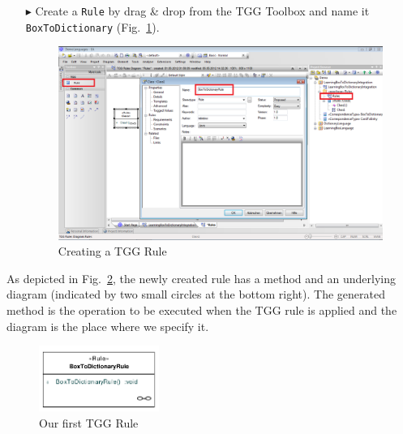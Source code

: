 \begin{enumerate}
\item[$\blacktriangleright$] Create a \texttt{Rule} by drag \& drop from the TGG Toolbox and name it \texttt{BoxToDictionary} (Fig.~\ref{fig:create_tgg_rule}).

\begin{figure}[htbp]
\begin{center}
  \includegraphics[width=\textwidth]{pics/tggBilder/tggRule/tgg8}
  \caption{Creating a TGG Rule}  
  \label{fig:create_tgg_rule}
\end{center}
\end{figure}

\end{enumerate}

As depicted in Fig.~\ref{fig:first_tgg_rule}, the newly created rule has a method and an underlying diagram (indicated by two small circles at the bottom right).
The generated method is the operation to be executed when the TGG rule is applied and the diagram is the place where we specify it.

\begin{figure}[htbp]
\begin{center}
  \includegraphics[width=0.35\textwidth]{pics/tggBilder/tggRule/tgg9}
  \caption{Our first TGG Rule}  
  \label{fig:first_tgg_rule}
\end{center}
\end{figure}

